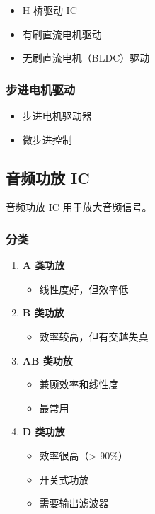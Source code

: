 \begin{itemize}
  \item H 桥驱动 IC
  \item 有刷直流电机驱动
  \item 无刷直流电机（BLDC）驱动
\end{itemize}

\subsubsection{步进电机驱动}

\begin{itemize}
  \item 步进电机驱动器
  \item 微步进控制
\end{itemize}

\subsection{音频功放 IC}

音频功放 IC 用于放大音频信号。

\subsubsection{分类}

\begin{enumerate}
  \item \textbf{A 类功放}
    \begin{itemize}
      \item 线性度好，但效率低
    \end{itemize}

  \item \textbf{B 类功放}
    \begin{itemize}
      \item 效率较高，但有交越失真
    \end{itemize}

  \item \textbf{AB 类功放}
    \begin{itemize}
      \item 兼顾效率和线性度
      \item 最常用
    \end{itemize}

  \item \textbf{D 类功放}
    \begin{itemize}
      \item 效率很高（> 90\%）
      \item 开关式功放
      \item 需要输出滤波器
    \end{itemize}
\end{enumerate}

